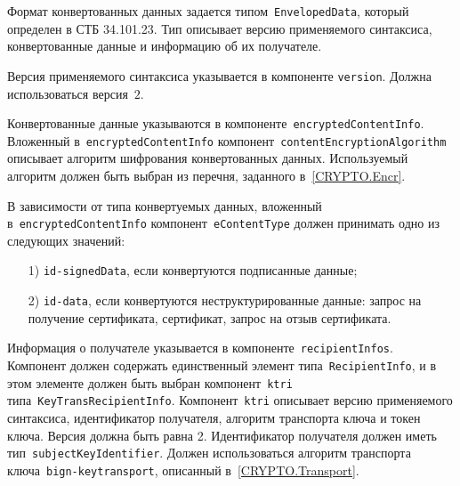 Формат конвертованных данных задается типом~\texttt{EnvelopedData}, который
определен в СТБ 34.101.23. Тип описывает версию применяемого синтаксиса,
конвертованные данные и информацию об их получателе.

Версия применяемого синтаксиса указывается в компоненте
\texttt{version}. Должна использоваться версия~$2$.

Конвертованные данные указываются в компоненте~\texttt{encryptedContentInfo}.
%
Вложенный в~\texttt{encryptedContentInfo} компонент~\texttt{contentEncryptionAlgorithm}
описывает алгоритм шифрования конвертованных данных. Используемый алгоритм 
должен быть выбран из перечня, заданного в~\ref{CRYPTO.Encr}.

В зависимости от типа конвертуемых данных, вложенный 
в~\texttt{encryptedContentInfo} компонент~\texttt{eContentType} 
должен принимать одно из следующих значений:
\begin{enumerate}
\item[1)]
\texttt{id-signedData}, если конвертуются подписанные данные;
\item[2)]
\texttt{id-data}, если конвертуются неструктурированные данные:
запрос на получение сертификата, сертификат, запрос на отзыв сертификата.
\end{enumerate}



Информация о получателе указывается в компоненте~\texttt{recipientInfos}.
Компонент должен содержать единственный элемент 
типа~\texttt{RecipientInfo}, и в этом элементе должен быть выбран  
компонент~\texttt{ktri} типа~\texttt{KeyTransRecipientInfo}.  
Компонент~\texttt{ktri} описывает версию применяемого синтаксиса, 
идентификатор получателя, алгоритм транспорта ключа и токен ключа. 
Версия должна быть равна 2. Идентификатор получателя должен 
иметь тип~\texttt{subjectKeyIdentifier}. Должен использоваться алгоритм 
транспорта ключа~\texttt{bign-keytransport}, описанный 
в~\ref{CRYPTO.Transport}. 

